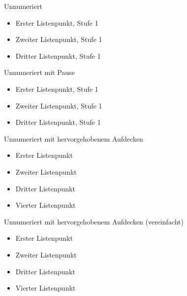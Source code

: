 	\begin{frame}{Unnumeriert}
		\begin{itemize}
			\item Erster Listenpunkt, Stufe 1
			\item Zweiter Listenpunkt, Stufe 1
			\item Dritter Listenpunkt, Stufe 1
		\end{itemize}
	\end{frame}


	\begin{frame}{Unnumeriert mit Pause}
		\begin{itemize}
			\item Erster Listenpunkt, Stufe 1
				\pause
			\item Zweiter Listenpunkt, Stufe 1
				\pause
			\item Dritter Listenpunkt, Stufe 1
		\end{itemize}
	\end{frame}


	\begin{frame}{Unnumeriert mit hervorgehobenem Aufdecken}
		\begin{itemize}
			\item<+-| alert@+> Erster Listenpunkt
			\item<+-| alert@+> Zweiter Listenpunkt
			\item<+-| alert@+> Dritter Listenpunkt
			\item<+-| alert@+> Vierter Listenpunkt
		\end{itemize}
	\end{frame}


	\begin{frame}{Unnumeriert mit hervorgehobenem Aufdecken (vereinfacht)}
		\begin{itemize}[<+-| alert@+>]
			\item Erster Listenpunkt
			\item Zweiter Listenpunkt
			\item Dritter Listenpunkt
			\item Vierter Listenpunkt
		\end{itemize}
	\end{frame}


